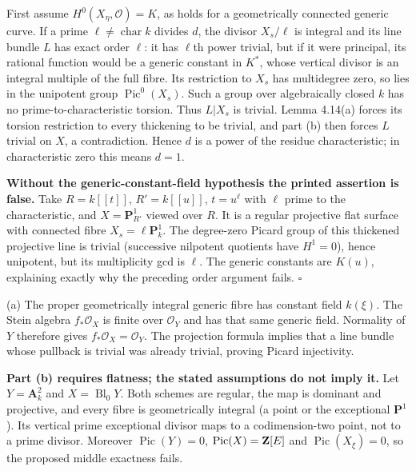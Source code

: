 \documentclass[11pt]{article}
\let\chapterexercise\exercise
\renewcommand{\exercise}[2]{\Needspace{8\baselineskip}\chapterexercise{#1}{#2}}
\begin{document}
\pf First assume $H^0(X_\eta,\mathcal O)=K$, as holds for a geometrically connected generic curve. If a prime $\ell\ne\operatorname{char}k$ divides $d$, the divisor $X_s/\ell$ is integral and its line bundle $L$ has exact order $\ell$: it has $\ell$th power trivial, but if it were principal, its rational function would be a generic constant in $K^*$, whose vertical divisor is an integral multiple of the full fibre. Its restriction to $X_s$ has multidegree zero, so lies in the unipotent group $\operatorname{Pic}^0(X_s)$. Such a group over algebraically closed $k$ has no prime-to-characteristic torsion. Thus $L|X_s$ is trivial. Lemma 4.14(a) forces its torsion restriction to every thickening to be trivial, and part (b) then forces $L$ trivial on $X$, a contradiction. Hence $d$ is a power of the residue characteristic; in characteristic zero this means $d=1$.

\textbf{Without the generic-constant-field hypothesis the printed assertion is false.} Take $R=k[[t]]$, $R'=k[[u]]$, $t=u^\ell$ with $\ell$ prime to the characteristic, and $X=\mathbf P^1_{R'}$ viewed over $R$. It is a regular projective flat surface with connected fibre $X_s=\ell\mathbf P^1_k$. The degree-zero Picard group of this thickened projective line is trivial (successive nilpotent quotients have $H^1=0$), hence unipotent, but its multiplicity gcd is $\ell$. The generic constants are $K(u)$, explaining exactly why the preceding order argument fails. \hfill$\square$

\pf (a) The proper geometrically integral generic fibre has constant field $k(\xi)$. The Stein algebra $f_*\mathcal O_X$ is finite over $\mathcal O_Y$ and has that same generic field. Normality of $Y$ therefore gives $f_*\mathcal O_X=\mathcal O_Y$. The projection formula implies that a line bundle whose pullback is trivial was already trivial, proving Picard injectivity.

\textbf{Part (b) requires flatness; the stated assumptions do not imply it.} Let $Y=\mathbf A^2_k$ and $X=\operatorname{Bl}_0Y$. Both schemes are regular, the map is dominant and projective, and every fibre is geometrically integral (a point or the exceptional $\mathbf P^1$). Its vertical prime exceptional divisor maps to a codimension-two point, not to a prime divisor. Moreover $\operatorname{Pic}(Y)=0$, $\operatorname{Pic}(X)=\mathbf Z[E]$ and $\operatorname{Pic}(X_\xi)=0$, so the proposed middle exactness fails.
\end{document}
